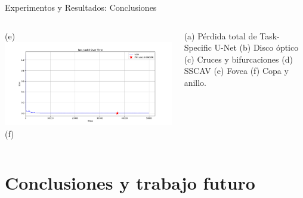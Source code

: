\documentclass[xcolor=dvipsnames,table]{beamer}
\begin{document}
\begin{frame}{Experimentos y Resultados: Conclusiones}
\begin{columns}[T]
\begin{minipage}[t]{\textwidth}
\begin{columns}[c]
				{\scriptsize (e)}
				\centering
				\includegraphics[width=\textwidth]{my_images/DL/loss_task5_plot.png}\\[-2mm]
				
				{\scriptsize (f)}
			\end{columns}
		\end{minipage}
		
		\vspace{0.1cm}
		{\tiny
			(a) Pérdida total de Task-Specific U-Net
			(b) Disco óptico
			(c) Cruces y bifurcaciones
			(d) SSCAV
			(e) Fovea
			(f) Copa y anillo.
		}
		
		
		
		
		
	\end{columns}
\end{frame}	

\section{Conclusiones y trabajo futuro}
\end{document}
